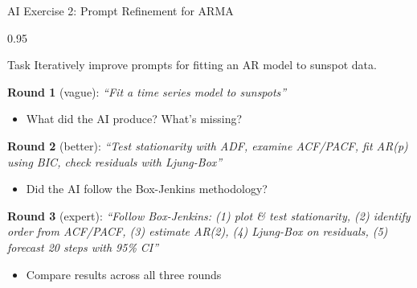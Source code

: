 \documentclass[9pt, aspectratio=169, t]{beamer}
\begin{document}
\begin{frame}{AI Exercise 2: Prompt Refinement for ARMA}
    \begin{cminipage}{0.95\textwidth}
    \begin{block}{Task}
        Iteratively improve prompts for fitting an AR model to sunspot data.
    \end{block}

    \vspace{0.2cm}

    {\footnotesize
    \textbf{Round 1} (vague): \textit{``Fit a time series model to sunspots''}
    \begin{itemize}\setlength{\itemsep}{0pt}
        \item What did the AI produce? What's missing?
    \end{itemize}

    \textbf{Round 2} (better): \textit{``Test stationarity with ADF, examine ACF/PACF, fit AR(p) using BIC, check residuals with Ljung-Box''}
    \begin{itemize}\setlength{\itemsep}{0pt}
        \item Did the AI follow the Box-Jenkins methodology?
    \end{itemize}

    \textbf{Round 3} (expert): \textit{``Follow Box-Jenkins: (1) plot \& test stationarity, (2) identify order from ACF/PACF, (3) estimate AR(2), (4) Ljung-Box on residuals, (5) forecast 20 steps with 95\% CI''}
    \begin{itemize}\setlength{\itemsep}{0pt}
        \item Compare results across all three rounds
    \end{itemize}
    }
    \end{cminipage}
\end{frame}
\end{document}
